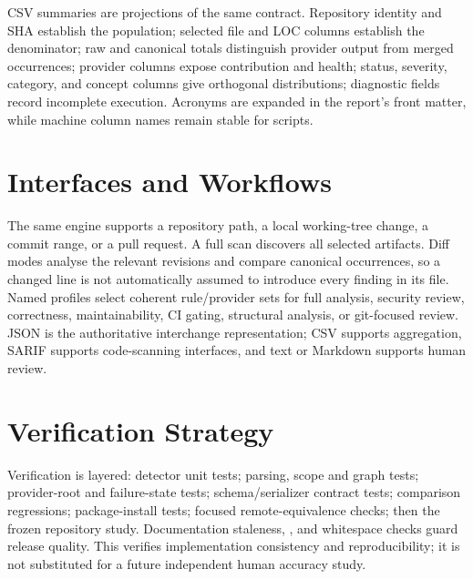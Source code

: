 CSV summaries are projections of the same contract. Repository identity and
SHA establish the population; selected file and LOC columns establish the
denominator; raw and canonical totals distinguish provider output from merged
occurrences; provider columns expose contribution and health; status, severity,
category, and concept columns give orthogonal distributions; diagnostic fields
record incomplete execution. Acronyms are expanded in the report's front
matter, while machine column names remain stable for scripts.

\section{Interfaces and Workflows}
The same engine supports a repository path, a local working-tree change, a
commit range, or a pull request. A full scan discovers all selected artifacts.
Diff modes analyse the relevant revisions and compare canonical occurrences,
so a changed line is not automatically assumed to introduce every finding in
its file. Named profiles select coherent rule/provider sets for full analysis,
security review, correctness, maintainability, CI gating, structural analysis,
or git-focused review. JSON is the authoritative interchange representation;
CSV supports aggregation, SARIF supports code-scanning interfaces, and text or
Markdown supports human review.

\section{Verification Strategy}
Verification is layered: detector unit tests; parsing, scope and graph tests;
provider-root and failure-state tests; schema/serializer contract tests;
comparison regressions; package-install tests; focused remote-equivalence
checks; then the frozen repository study. Documentation staleness,
, and whitespace checks guard release quality. This verifies
implementation consistency and reproducibility; it is not substituted for a
future independent human accuracy study.
